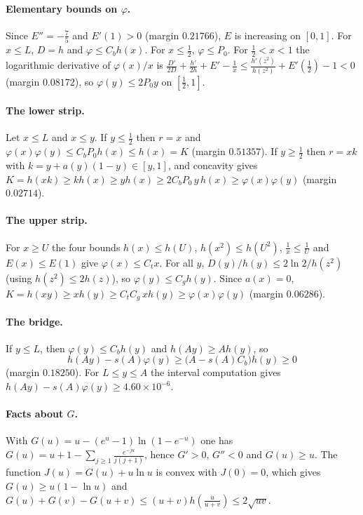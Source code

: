 \documentclass[12pt]{article}
\theoremstyle{plain}
\begin{document}
\paragraph*{Elementary bounds on $\varphi$.} Since $E''=-\frac75$ and $E'(1)>0$ (margin $0.21766$), $E$ is increasing on $[0,1]$. For $x\le L$, $D=h$ and $\varphi\le C_bh(x)$. For $x\le\frac12$, $\varphi\le P_0$. For $\frac12<x<1$ the logarithmic derivative of $\varphi(x)/x$ is $\frac{D'}{2D}+\frac{h'}{2h}+E'-\frac1x\le\frac{h'(z^2)}{h(z^2)}+E'(\frac12)-1<0$ (margin $0.08172$), so $\varphi(y)\le 2P_0y$ on $[\frac12,1]$.

\paragraph*{The lower strip.} Let $x\le L$ and $x\le y$. If $y\le\frac12$ then $r=x$ and $\varphi(x)\varphi(y)\le C_bP_0h(x)\le h(x)=K$ (margin $0.51357$). If $y\ge\frac12$ then $r=xk$ with $k=y+a(y)(1-y)\in[y,1]$, and concavity gives $K=h(xk)\ge kh(x)\ge yh(x)\ge 2C_bP_0\,y\,h(x)\ge\varphi(x)\varphi(y)$ (margin $0.02714$).

\paragraph*{The upper strip.} For $x\ge U$ the four bounds $h(x)\le h(U)$, $h(x^2)\le h(U^2)$, $\frac1x\le\frac1U$ and $E(x)\le E(1)$ give $\varphi(x)\le C_tx$. For all $y$, $D(y)/h(y)\le 2\ln 2/h(z^2)$ (using $h(z^2)\le 2h(z)$), so $\varphi(y)\le C_gh(y)$. Since $a(x)=0$, $K=h(xy)\ge xh(y)\ge C_tC_g\,xh(y)\ge\varphi(x)\varphi(y)$ (margin $0.06286$).

\paragraph*{The bridge.} If $y\le L$, then $\varphi(y)\le C_bh(y)$ and $h(Ay)\ge Ah(y)$, so
\[
h(Ay)-s(A)\varphi(y)\ge\bigl(A-s(A)C_b\bigr)h(y)\ge 0
\]
(margin $0.18250$). For $L\le y\le A$ the interval computation gives $h(Ay)-s(A)\varphi(y)\ge 4.60\times10^{-6}$.

\paragraph*{Facts about $G$.} With $G(u)=u-(e^u-1)\ln(1-e^{-u})$ one has $G(u)=u+1-\sum_{j\ge1}\frac{e^{-ju}}{j(j+1)}$, hence $G'>0$, $G''<0$ and $G(u)\ge u$. The function $J(u)=G(u)+u\ln u$ is convex with $J(0)=0$, which gives $G(u)\ge u(1-\ln u)$ and $G(u)+G(v)-G(u+v)\le(u+v)h(\frac{u}{u+v})\le 2\sqrt{uv}$.
\end{document}
